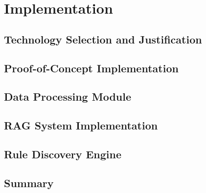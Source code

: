 \chapter{Implementation}
\label{ch:implementation}

\section{Technology Selection and Justification}
\label{sec:technology-selection}


\section{Proof-of-Concept Implementation}
\label{sec:poc-implementation}


\section{Data Processing Module}
\label{sec:data-processing-module}


\section{RAG System Implementation}
\label{sec:rag-implementation}


\section{Rule Discovery Engine}
\label{sec:rule-engine}


\section{Summary}
\label{sec:implementation-summary}

